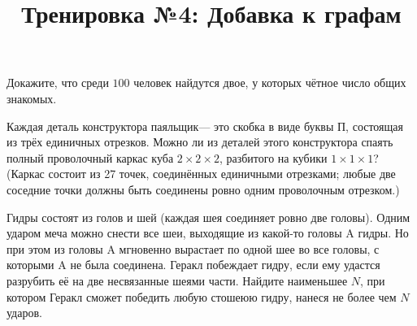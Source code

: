 



\title{Тренировка №4: Добавка к графам}
\maketitle

\begin{problem}
	Докажите, что среди $100$ человек найдутся двое, у которых чётное число общих знакомых.
\end{problem}

\begin{problem}
	Каждая деталь конструктора  паяльщик\guillemotright --- это скобка в виде буквы П, состоящая из трёх единичных отрезков. Можно ли из деталей этого конструктора спаять полный проволочный каркас куба $2 \times 2 \times 2$, разбитого на кубики $1 \times 1 \times 1$? (Каркас состоит из 27 точек, соединённых единичными отрезками; любые две соседние точки должны быть соединены ровно одним проволочным отрезком.)
\end{problem}

\begin{problem}
	Гидры состоят из голов и шей (каждая шея соединяет ровно две головы). Одним ударом меча можно снести все шеи, выходящие из какой-то головы A гидры. Но при этом из головы A мгновенно вырастает по одной шее во все головы, с которыми A не была соединена. Геракл побеждает гидру, если ему удастся разрубить её на две несвязанные шеями части. Найдите наименьшее $N$, при котором Геракл сможет победить любую стошеюю гидру, нанеся не более чем $N$ ударов.
\end{problem}

